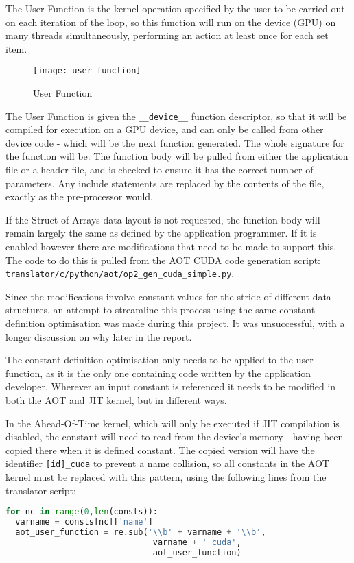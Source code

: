 The User Function is the kernel operation specified by the user to be carried out on each iteration of the loop, so this function will run on the device (GPU) on many threads simultaneously, performing an action at least once for each set item.

\begin{wrapfigure}[12]{r}{.33\textwidth}
  \centering
  \caption{User Function}
  \label{fig:usr_func}
  \texttt{[image: user\_function]}
\end{wrapfigure}
The User Function is given the \verb|__device__| function  descriptor, so that it will be compiled for execution on a GPU device, and can only be called from other device code - which will be the next function generated. The whole signature for the function will be:
\noindent The function body will be pulled from either the application file or a header file, and is checked to ensure it has the correct number of parameters. Any include statements are replaced by the contents of the file, exactly as the pre-processor would.
\par
{} If the Struct-of-Arrays data layout is not requested, the function body will remain largely the same as defined by the application programmer. If it is enabled however there are modifications that need to be made to support this. The code to do this is pulled from the AOT CUDA code generation script: \\\verb|translator/c/python/aot/op2_gen_cuda_simple.py|.
\par
Since the modifications involve constant values for the stride of different data structures, an attempt to streamline this process using the same constant definition optimisation was made during this project. It was unsuccessful, with a longer discussion on why later in the report.
\par
{} The constant definition optimisation only needs to be applied to the user function, as it is the only one containing code written by the application developer. Wherever an input constant is referenced it needs to be modified in both the AOT and JIT kernel, but in different ways.

In the Ahead-Of-Time kernel, which will only be executed if JIT compilation is disabled, the constant will need to read from the device's memory - having been copied there when it is defined constant. The copied version will have the identifier \verb|[id]_cuda| to prevent a name collision, so all constants in the AOT kernel must be replaced with this pattern, using the following lines from the translator script:\\
\begin{lstlisting}[backgroundcolor = \color{lightgray!20}, language=Python]
for nc in range(0,len(consts)):
  varname = consts[nc]['name']
  aot_user_function = re.sub('\\b' + varname + '\\b',
                              varname + '_cuda',
                              aot_user_function)
\end{lstlisting}

